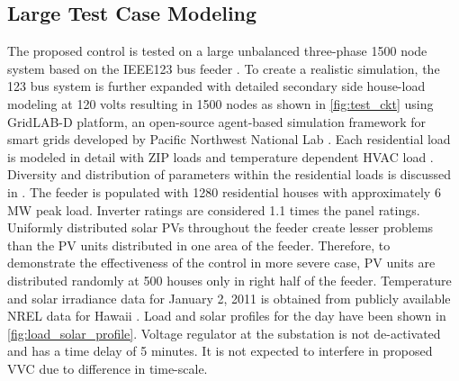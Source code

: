 \documentclass[journal]{IEEEtran}
\newcommand{\squeezeup}{\vspace{-2.5mm}}
\begin{document}

\subsection{Large Test Case Modeling}
The proposed control is tested on a large unbalanced three-phase 1500 node system based on the IEEE123 bus feeder \cite{noauthor_ieee_nodate-1}. To create a realistic simulation, the 123 bus system is further expanded with detailed secondary side house-load modeling at 120 volts resulting in 1500 nodes as shown in \figurename \ref{fig:test_ckt} using GridLAB-D platform, an open-source agent-based simulation framework for smart grids developed by Pacific Northwest National Lab \cite{chassin_gridlab-d:_2014}. Each residential load is modeled in detail with ZIP loads and temperature dependent HVAC load \cite{schneider_multi-state_2011}. Diversity and distribution of parameters within the residential loads is discussed in \cite{fuller_evaluation_2012}. The feeder is populated with 1280 residential houses with approximately 6 MW peak load.  Inverter ratings are considered 1.1 times the panel ratings. Uniformly distributed solar PVs throughout the feeder create lesser problems than the PV units distributed in one area of the feeder. Therefore, to demonstrate the effectiveness of the control in more severe case, PV units are distributed randomly at 500 houses only in right half of the feeder. Temperature and solar irradiance data for January 2, 2011 is obtained from publicly available NREL data for Hawaii \cite{sengupta_oahu_2010}. Load and solar profiles for the day have been shown in \figurename \ref{fig:load_solar_profile}.  {Voltage regulator at the substation is not de-activated and has a time delay of 5 minutes. It is not expected to interfere in proposed VVC due to difference in time-scale.}
\end{document}

